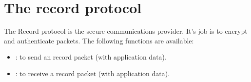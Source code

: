 \section{The record protocol}

The Record protocol is the secure communications provider. It's job is
to encrypt and authenticate packets. 
The following functions are available:
\par
\begin{itemize}
\item {}:
to send an record packet (with application data).
\item {}:
to receive a record packet (with application data).
\end{itemize}



